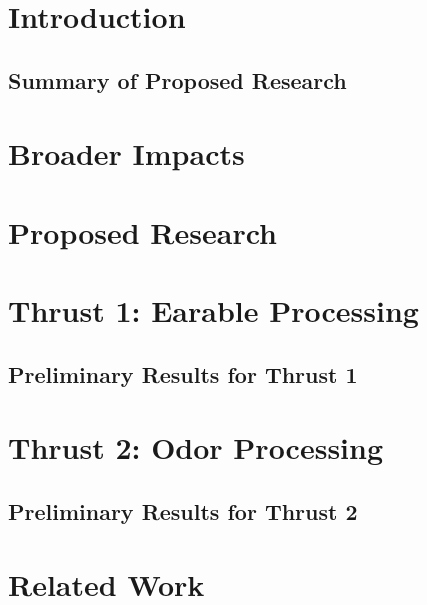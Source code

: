 \maketitle
\section{Introduction}


\subsection{Summary of Proposed Research}
\label{ssec:summary}


\section{Broader Impacts}


\section{Proposed Research}


\section{Thrust 1: Earable Processing}
\label{sec:tract1}
\subsection{Preliminary Results for Thrust 1}
\label{ssec:prelim1}


\section{Thrust 2: Odor Processing}
\label{sec:tract2}
\subsection{Preliminary Results for Thrust 2}
\label{ssec:prelim2}


\section{Related Work}

